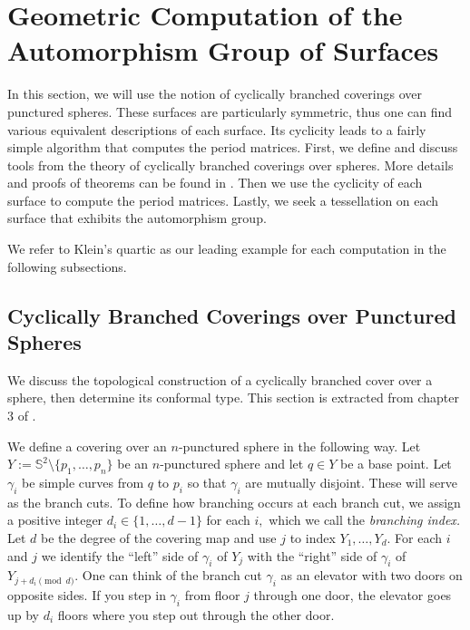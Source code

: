 \documentclass[12pt,reqno]{amsart}
\theoremstyle{definition}
\theoremstyle{remark}
\begin{document}







\section{Geometric Computation of the Automorphism Group of Surfaces}
\label{sec:chap3}
In this section, we will use the notion of cyclically branched coverings over punctured spheres. These surfaces are particularly symmetric, thus one can find various equivalent descriptions of each surface. Its cyclicity leads to a fairly simple algorithm that computes the period matrices. First, we define and discuss tools from the theory of cyclically branched coverings over spheres. More details and proofs of theorems can be found in \cite{dthesis}. Then we use the cyclicity of each surface to compute the period matrices. Lastly, we seek a tessellation on each surface that exhibits the automorphism group.  %

We refer to Klein's quartic as our leading example for each computation in the following subsections.


\subsection{Cyclically Branched Coverings over Punctured Spheres}

We discuss the topological construction of a cyclically branched cover over a sphere, then determine its conformal type. This section is extracted from chapter 3 of \cite{dthesis}.

We define a covering over an $n$-punctured sphere in the following way. Let $Y := \mathbb{S}^2 \setminus \{p_1, \ldots , p_n\}$ be an $n$-punctured sphere and let $q \in Y$ be a base point. Let $\gamma_i$ be simple curves from $q$ to $p_i$ so that $\gamma_i$ are mutually disjoint. These will serve as the branch cuts. To define how branching occurs at each branch cut, we assign a positive integer $d_i \in \{1, \ldots, d - 1\}$ for each $i,$ which we call the \textit{branching index.} Let $d$ be the degree of the covering map and use $j$ to index $Y_1, \ldots , Y_d.$ For each $i$ and $j$ we identify the ``left'' side of $\gamma_i$ of $Y_j$ with the ``right'' side of $\gamma_i$ of $Y_{j + d_i \pmod d}.$ One can think of the branch cut $\gamma_i$ as an elevator with two doors on opposite sides. If you step in $\gamma_i$ from floor $j$ through one door, the elevator goes up by $d_i$ floors where you step out through the other door. 
\end{document}
